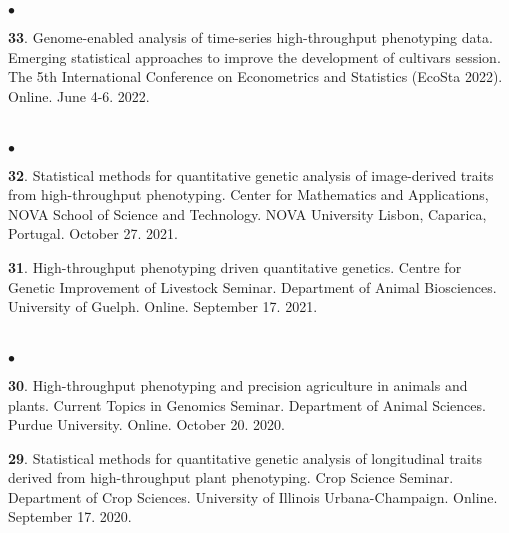 \documentclass[margin,line,10pt]{res}
\newenvironment{list2}{
  \begin{list}{$\bullet$}{%
      \setlength{\itemsep}{0in}
      \setlength{\parsep}{0in} \setlength{\parskip}{0in}
      \setlength{\topsep}{0in} \setlength{\partopsep}{0in} 
      \setlength{\leftmargin}{0.2in}}}{\end{list}}
\begin{document}
\begin{resume}
\begin{list2}
\vspace{0.5cm}


\item [{\bf 33}.] Genome-enabled analysis of time-series high-throughput phenotyping data. Emerging statistical approaches to improve the development of cultivars session. The 5th International Conference on Econometrics and Statistics (EcoSta 2022). Online. June 4-6. 2022.

  
\end{list2}



\section{}
\begin{list2}

\item [{\bf 32}.] Statistical methods for quantitative genetic analysis of image-derived traits from high-throughput phenotyping. Center for Mathematics and Applications, NOVA School of Science and Technology. NOVA University Lisbon, Caparica, Portugal. October 27. 2021.

      \vspace{0.5cm}
  
 \item [{\bf 31}.] High-throughput phenotyping driven quantitative genetics. Centre for Genetic Improvement of Livestock Seminar. Department of Animal Biosciences. University of Guelph. Online. September 17. 2021.

\end{list2}

\section{}
\begin{list2}

  \item [{\bf 30}.] High-throughput phenotyping and precision agriculture in animals and plants. Current Topics in Genomics Seminar. Department of Animal Sciences. Purdue University. Online. October 20. 2020.

     \vspace{0.5cm}

 \item [{\bf 29}.] Statistical methods for quantitative genetic analysis of longitudinal traits derived from high-throughput plant phenotyping. Crop Science Seminar. Department of Crop Sciences. University of Illinois Urbana-Champaign. Online. September 17. 2020.


\end{list2}
\end{resume}
\end{document}
